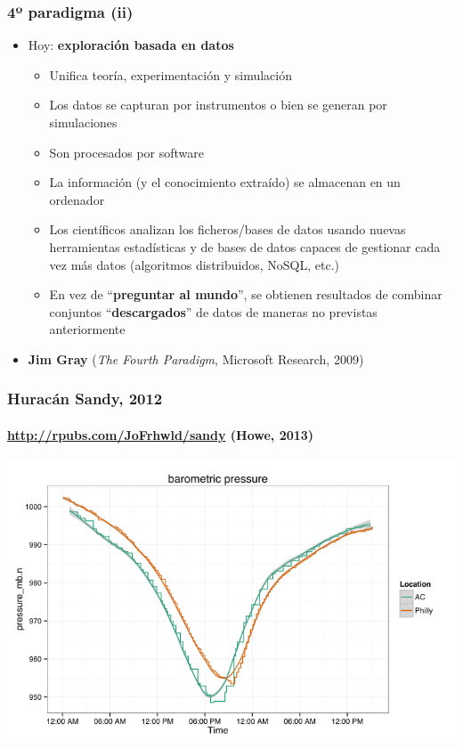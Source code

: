 \documentclass[14pt]{beamer}
\begin{document}
\begin{frame}
  \frametitle{4º paradigma (ii)}
\vspace*{-.5em}
  \begin{itemize}
  \item Hoy: {\bf exploración basada en datos}
    \begin{itemize}
    \item Unifica teoría, experimentación y simulación
\item Los datos se capturan por instrumentos o bien se generan por
  simulaciones
\item Son procesados por software
  \item La información (y el conocimiento extraído) se almacenan en un
    ordenador
    \item Los científicos analizan los ficheros/bases de datos usando
     nuevas herramientas estadísticas y de bases de datos capaces de
     gestionar cada vez más datos (algoritmos distribuidos, NoSQL, etc.)
   \item En vez de ``{\bf preguntar al mundo}'', se obtienen resultados de
     combinar conjuntos ``{\bf descargados}'' de datos de maneras no
     previstas anteriormente
    \end{itemize}
  \item  {\bf Jim Gray} ({\em The Fourth Paradigm}, Microsoft
    Research, 2009)
\end{itemize}
\end{frame}

\begin{frame}
  \frametitle{Huracán Sandy, 2012}
  \framesubtitle{\url{http://rpubs.com/JoFrhwld/sandy} (Howe, 2013)}
\includegraphics[width=\textwidth]{img/sandy}
\end{frame}
\end{document}
